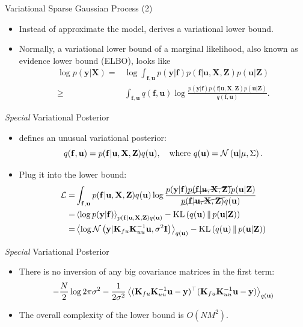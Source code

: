 \documentclass[14pt,aspectratio=1610]{beamer}
\newcommand{\yV}{\mathbf{y}}
\newcommand{\fV}{\mathbf{f}}
\newcommand{\xM}{\mathbf{X}}
\newcommand{\K}{\mathbf{K}}
\newcommand{\uV}{\mathbf{u}}
\newcommand{\zM}{\mathbf{Z}}
\newcommand{\bound}{\mathcal{L}}
\newcommand{\I}{\mathbf{I}}
\begin{document}
\begin{frame}{Variational Sparse Gaussian Process (2)}
\begin{itemize}
\item Instead of approximate the model, \cite{Titsias2009} derives a variational lower bound.

\item Normally, a variational lower bound of a marginal likelihood, also known as evidence lower bound (ELBO), looks like
\begin{align*}
\log p(\yV | \xM) =& \log \int_{\fV, \uV} p(\yV | \fV) p(\fV| \uV, \xM, \zM) p(\uV | \zM) \\
\geq& \int_{\fV, \uV} q(\fV, \uV) \log \frac{p(\yV | \fV) p(\fV| \uV, \xM, \zM) p(\uV | \zM)}{q(\fV, \uV)}.
\end{align*}
\end{itemize}

\end{frame}

\begin{frame}{\textit{Special} Variational Posterior}
\begin{itemize}
\item \cite{Titsias2009} defines an unusual variational posterior:
\[
q(\fV, \uV) = p(\fV| \uV, \xM, \zM) q(\uV), \quad \text{where } q(\uV) = \gaussianDist{\uV}{\mu}{\Sigma}.
\]
\item Plug it into the lower bound:
\begin{align*}
\bound =& \int_{\fV, \uV} p(\fV| \uV, \xM, \zM) q(\uV) \log \frac{p(\yV | \fV) \cancel{p(\fV| \uV, \xM, \zM)} p(\uV | \zM)}{\cancel{p(\fV| \uV, \xM, \zM)} q(\uV)} \\
=& \expectation{\log p(\yV | \fV)}_{p(\fV| \uV, \xM, \zM) q(\uV)} - \KL{q(\uV)}{p(\uV|\zM)}\\
=& \expectation{\log \gaussianDist{\yV}{\K_{fu}\K_{uu}^{-1}\uV}{\sigma^2\I}}_{q(\uV)} - \KL{q(\uV)}{p(\uV|\zM)}
\end{align*}

\end{itemize}
\end{frame}

\begin{frame}{\textit{Special} Variational Posterior}
\begin{itemize}
\item There is no inversion of any big covariance matrices in the first term:
\begin{align*}
 -\frac{N}{2}\log 2\pi \sigma^2 -\frac{1}{2\sigma^2}\expectation{(\K_{fu}\K_{uu}^{-1}\uV-\yV)^\top(\K_{fu}\K_{uu}^{-1}\uV-\yV)}_{q(\uV)}
\end{align*}
\item The overall complexity of the lower bound is $O(NM^2)$.
\end{itemize}
\end{frame}
\end{document}
